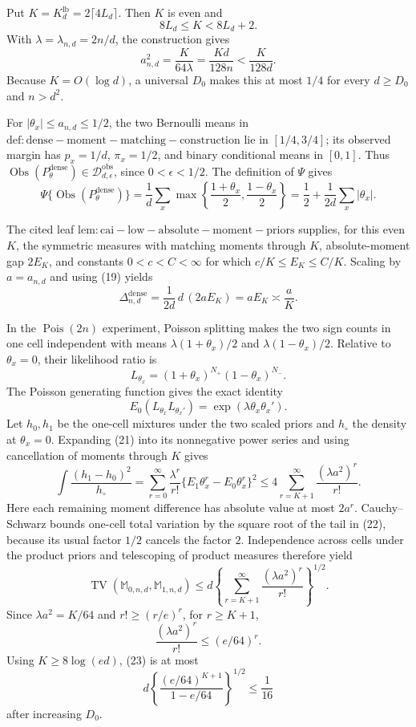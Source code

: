 Put \(K=K_d^{\mathrm{lb}}=2\lceil4L_d\rceil\).  Then \(K\) is even and
\[
 8L_d\leq K<8L_d+2.                                                  \tag{18}
\]
With \(\lambda=\lambda_{n,d}=2n/d\), the construction gives
\[
 a_{n,d}^2=\frac K{64\lambda}=\frac{Kd}{128n}<\frac K{128d}.
\]
Because \(K=O(\log d)\), a universal \(D_0\) makes this at most \(1/4\) for every \(d\geq D_0\) and \(n>d^2\).

For \(|\theta_x|\leq a_{n,d}\leq1/2\), the two Bernoulli means in \(\mathrm{def:dense-moment-matching-construction}\) lie in \([1/4,3/4]\); its observed margin has \(p_x=1/d\), \(\pi_x=1/2\), and binary conditional means in \([0,1]\).  Thus \(\operatorname{Obs}(P_\theta^{\mathrm{dense}})\in\mathcal D_{d,\epsilon}^{\mathrm{obs}}\), since \(0<\epsilon<1/2\).  The definition of \(\Psi\) gives
\[
 \Psi\{\operatorname{Obs}(P_\theta^{\mathrm{dense}})\}
 =\frac1d\sum_x\max\left\{\frac{1+\theta_x}{2},\frac{1-\theta_x}{2}\right\}
 =\frac12+\frac1{2d}\sum_x|\theta_x|.                              \tag{19}
\]

The cited leaf \(\mathrm{lem:cai-low-absolute-moment-priors}\) supplies, for this even \(K\), the symmetric measures with matching moments through \(K\), absolute-moment gap \(2E_K\), and constants \(0<c<C<\infty\) for which \(c/K\leq E_K\leq C/K\).  Scaling by \(a=a_{n,d}\) and using (19) yields
\[
 \Delta_{n,d}^{\mathrm{dense}}=\frac1{2d}\,d\,(2aE_K)=aE_K
 \asymp\frac aK.                                                     \tag{20}
\]

In the \(\operatorname{Pois}(2n)\) experiment, Poisson splitting makes the two sign counts in one cell independent with means \(\lambda(1+\theta_x)/2\) and \(\lambda(1-\theta_x)/2\).  Relative to \(\theta_x=0\), their likelihood ratio is
\[
 L_{\theta_x}=(1+\theta_x)^{N_+}(1-\theta_x)^{N_-}.
\]
The Poisson generating function gives the exact identity
\[
 E_0(L_{\theta_x}L_{\theta_x'})
 =\exp(\lambda\theta_x\theta_x').                                  \tag{21}
\]
Let \(h_0,h_1\) be the one-cell mixtures under the two scaled priors and \(h_\circ\) the density at \(\theta_x=0\).  Expanding (21) into its nonnegative power series and using cancellation of moments through \(K\) gives
\[
 \int\frac{(h_1-h_0)^2}{h_\circ}
 =\sum_{r=0}^{\infty}\frac{\lambda^r}{r!}
   \{E_1\theta_x^r-E_0\theta_x^r\}^2
 \leq4\sum_{r=K+1}^{\infty}\frac{(\lambda a^2)^r}{r!}.           \tag{22}
\]
Here each remaining moment difference has absolute value at most \(2a^r\).  Cauchy--Schwarz bounds one-cell total variation by the square root of the tail in (22), because its usual factor \(1/2\) cancels the factor \(2\).  Independence across cells under the product priors and telescoping of product measures therefore yield
\[
 \operatorname{TV}(\mathbb M_{0,n,d},\mathbb M_{1,n,d})
 \leq d\left\{\sum_{r=K+1}^{\infty}\frac{(\lambda a^2)^r}{r!}\right\}^{1/2}. \tag{23}
\]
Since \(\lambda a^2=K/64\) and \(r!\geq(r/e)^r\), for \(r\geq K+1\),
\[
 \frac{(\lambda a^2)^r}{r!}\leq(e/64)^r.
\]
Using \(K\geq8\log(ed)\), (23) is at most
\[
 d\left\{\frac{(e/64)^{K+1}}{1-e/64}\right\}^{1/2}\leq\frac1{16} \tag{24}
\]
after increasing \(D_0\).

